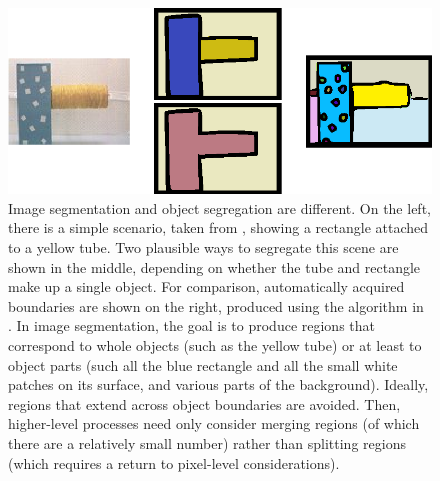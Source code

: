 
%



\begin{figure}

\centerline{\includegraphics[width=0.75\columnwidth]{fig-seg}}

\caption{
%
Image segmentation and object segregation are different.  On the left,
there is a simple scenario, taken from ,
showing a rectangle attached to a yellow tube.  Two 
plausible ways to segregate this scene are shown in the middle,
depending on whether the tube and rectangle make up a single 
object.
For
comparison, automatically acquired boundaries are shown on the right,
produced using the algorithm in
. 
In image segmentation, the goal is to
produce regions that correspond to whole objects (such as the yellow
tube) or at least to object parts (such all the blue rectangle and all
the small white patches on its surface, and various parts of the
background).  Ideally, regions that extend across object boundaries
are avoided.  Then, higher-level processes need only consider merging
regions (of which there are a relatively small number) rather than
splitting regions (which requires a return to pixel-level
considerations).  
%
%
}

\label{fig:image-segmentation}

\end{figure}



%
%

